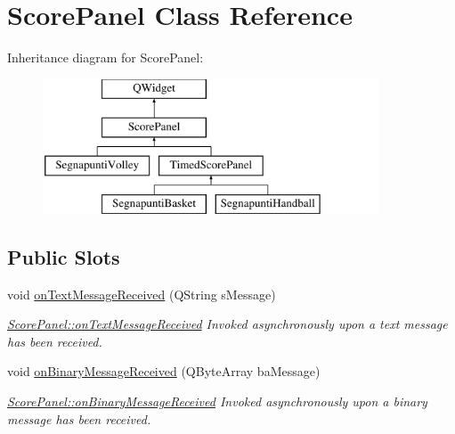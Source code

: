 \hypertarget{classScorePanel}{}\section{Score\+Panel Class Reference}
\label{classScorePanel}
Inheritance diagram for Score\+Panel\+:\begin{figure}[H]
\begin{center}
\leavevmode
\includegraphics[height=4.000000cm]{d3/dba/classScorePanel}
\end{center}
\end{figure}
\subsection*{Public Slots}
\begin{DoxyCompactItemize}
\item 
void \mbox{\hyperlink{classScorePanel_af3d7aa48c21c4e63d398dac5a2266130}{on\+Text\+Message\+Received}} (Q\+String s\+Message)
\begin{DoxyCompactList}\small\item\em \mbox{\hyperlink{classScorePanel_af3d7aa48c21c4e63d398dac5a2266130}{Score\+Panel\+::on\+Text\+Message\+Received}} Invoked asynchronously upon a text message has been received. \end{DoxyCompactList}\item 
void \mbox{\hyperlink{classScorePanel_a2588d1e54b9c669ea352bab4215bef42}{on\+Binary\+Message\+Received}} (Q\+Byte\+Array ba\+Message)
\begin{DoxyCompactList}\small\item\em \mbox{\hyperlink{classScorePanel_a2588d1e54b9c669ea352bab4215bef42}{Score\+Panel\+::on\+Binary\+Message\+Received}} Invoked asynchronously upon a binary message has been received. \end{DoxyCompactList}\end{DoxyCompactItemize}
